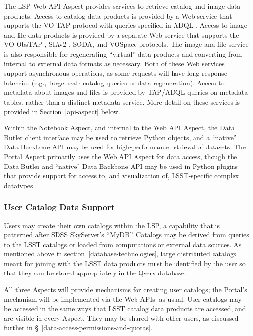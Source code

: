 The LSP Web API Aspect provides services to retrieve catalog and image data
products.
Access to catalog data products is provided by a Web service that
supports the VO TAP protocol \citep{2010ivoa.spec.0327D} with queries specified
in ADQL \citep{2008ivoa.spec.1030O}.
Access to image
and file data products is provided by a separate Web service that supports the
VO ObsTAP \citep{2017ivoa.spec.0509L},
SIAv2 \citep{2015ivoa.spec.1223D}, SODA, and VOSpace \citep{2013ivoa.spec.0329G} protocols.
The image and file service is also
responsible for regenerating ``virtual'' data products and converting from
internal to external data formats as necessary.
Both of these Web services
support asynchronous operations, as some requests will have long response
latencies (e.g.,\  large-scale catalog queries or data regeneration).
Access to
metadata about images and files is provided by TAP/ADQL queries on metadata
tables, rather than a distinct metadata service.  More detail on these services
is provided in Section~\ref{api-aspect} below.

Within the Notebook Aspect, and internal to the Web API Aspect, the Data
Butler client interface may be used to retrieve Python objects, and a
``native'' Data Backbone API may be used for high-performance retrieval of
datasets.
The Portal Aspect primarily uses the Web API Aspect for data access,
though the Data Butler and ``native'' Data Backbone API may be used in Python
plugins that provide support for access to, and visualization of, LSST-specific
complex datatypes.

\subsubsection{User Catalog Data Support}\label{user-catalog-data-support}

Users may create their own catalogs within the LSP, a capability that is
patterned after SDSS SkyServer's ``MyDB''.
Catalogs may be derived from queries
to the LSST catalogs or loaded from computations or external data sources.  As
mentioned above in section~\ref{database-technologies}, large distributed
catalogs meant for joining with the LSST data products must be identified by
the user so that they can be stored appropriately in the Qserv database.

All three Aspects will provide mechanisms for creating user catalogs; the
Portal's mechanism will be implemented via the Web APIs, as usual.
User catalogs may be accessed in the same ways that LSST catalog data products
are accessed, and are visible in every Aspect.
They may be shared with other users, as discussed further in
\S~\ref{data-access-permissions-and-quotas}.

